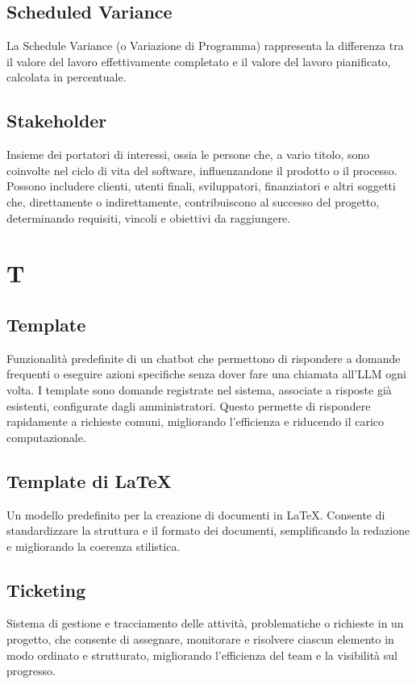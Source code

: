 \documentclass{article}
\begin{document}
\subsection{Scheduled Variance}
La Schedule Variance (o Variazione di Programma) rappresenta la differenza tra il valore del lavoro effettivamente completato e il valore del lavoro pianificato, calcolata in percentuale.

\subsection{Stakeholder}
Insieme dei portatori di interessi, ossia le persone che, a vario titolo, sono coinvolte nel ciclo di vita del software, influenzandone il prodotto o il processo. Possono includere clienti, utenti finali, sviluppatori, finanziatori e altri soggetti che, direttamente o indirettamente, contribuiscono al successo del progetto, determinando requisiti, vincoli e obiettivi da raggiungere.


\newpage
\section{T}

\subsection{Template}
Funzionalità predefinite di un chatbot che permettono di rispondere a domande frequenti o eseguire azioni specifiche senza dover fare una chiamata all'LLM ogni volta. I template sono domande registrate nel sistema, associate a risposte già esistenti, configurate dagli amministratori. Questo permette di rispondere rapidamente a richieste comuni, migliorando l'efficienza e riducendo il carico computazionale.

\subsection{Template di LaTeX}
Un modello predefinito per la creazione di documenti in LaTeX. Consente di standardizzare la struttura e il formato dei documenti, semplificando la redazione e migliorando la coerenza stilistica.

\subsection{Ticketing}
Sistema di gestione e tracciamento delle attività, problematiche o richieste in un progetto, che consente di assegnare, monitorare e risolvere ciascun elemento in modo ordinato e strutturato, migliorando l'efficienza del team e la visibilità sul progresso.
 
\end{document}
